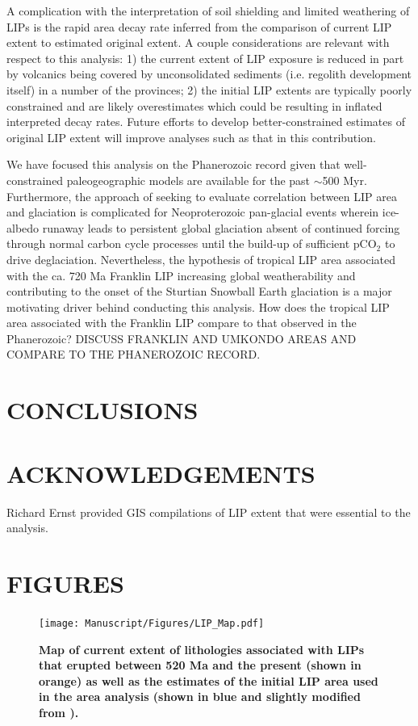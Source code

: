 \documentclass[11pt,letterpaper]{article}
\begin{document}
A complication with the interpretation of soil shielding and limited weathering of LIPs is the rapid area decay rate inferred from the comparison of current LIP extent to estimated original extent. A couple considerations are relevant with respect to this analysis: 1) the current extent of LIP exposure is reduced in part by volcanics being covered by unconsolidated sediments (i.e. regolith development itself) in a number of the provinces; 2) the initial LIP extents are typically poorly constrained and are likely overestimates which could be resulting in inflated interpreted decay rates. Future efforts to develop better-constrained estimates of original LIP extent will improve analyses such as that in this contribution.

We have focused this analysis on the Phanerozoic record given that well-constrained paleogeographic models are available for the past $\sim$500 Myr. Furthermore, the approach of seeking to evaluate correlation between LIP area and glaciation is complicated for Neoproterozoic pan-glacial events wherein ice-albedo runaway leads to persistent global glaciation absent of continued forcing through normal carbon cycle processes until the build-up of sufficient pCO$_2$ to drive deglaciation. Nevertheless, the  hypothesis of tropical LIP area associated with the ca. 720 Ma Franklin LIP increasing global weatherability and contributing to the onset of the Sturtian Snowball Earth glaciation is a major motivating driver behind conducting this analysis. How does the tropical LIP area associated with the Franklin LIP compare to that observed in the Phanerozoic? DISCUSS FRANKLIN AND UMKONDO AREAS AND COMPARE TO THE PHANEROZOIC RECORD. 

\section*{CONCLUSIONS}

\section*{ACKNOWLEDGEMENTS \label{sec:ACKNOWLEDGEMENTS}}

Richard Ernst provided GIS compilations of LIP extent that were essential to the analysis.

\section*{FIGURES}

\begin{figure}[h!]
\begin{center}
	\texttt{[image: Manuscript/Figures/LIP\_Map.pdf]}
	\caption{\textbf{Map of current extent of lithologies associated with LIPs that erupted between 520 Ma and the present (shown in orange) as well as the estimates of the initial LIP area used in the area analysis (shown in blue and slightly modified from \citealp{Ernst2017a}).}}
	\label{fig:LIP_map}
\end{center}
\end{figure}
\end{document}
